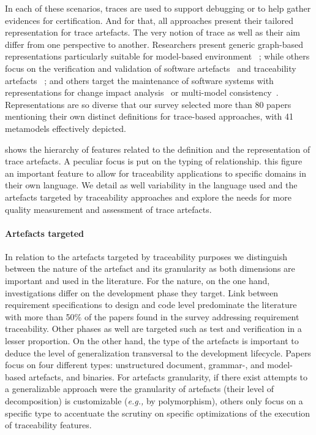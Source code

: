 In each of these scenarios, traces are used to support debugging or to help gather evidences for certification. And for that, all approaches present their tailored representation for trace artefacts. The very notion of trace as well as their aim differ from one perspective to another. %
Researchers present generic graph-based representations particularly suitable for model-based environment~\cite{schwarz2010-graph-based-traceability,grammel2012-model-matching-for-traceability-in-MDE} ; while others focus on  the verification and validation of software artefacts~\cite{Dubois_2010,vonknethen2002-change-oriented-req-traceability-evolution-of-embedded-systems} and traceability artefacts~\cite{rempl2014-conformance-of-traceability-to-guidelines} ; and others target the maintenance of software systems with representations for change impact analysis~\cite{goknil2014-change-impact-analysis-for-requirement-metamodel} or multi-model consistency~\cite{Szabo_2013}. Representations are so diverse that our survey selected more than 80 papers mentioning their own distinct definitions for trace-based approaches, with 41 metamodels effectively depicted. 


 shows the hierarchy of features related to the definition and the representation of trace artefacts. A peculiar focus is put on the typing of relationship. this figure an important feature to allow for traceability applications to specific domains in their own language. We detail as well variability in the language used and the artefacts targeted by traceability approaches and explore the needs for more quality measurement and assessment of trace artefacts.


\paragraph{Artefacts targeted} 
In relation to the artefacts targeted by traceability purposes we distinguish between the nature of the artefact and its granularity as both dimensions are important and used in the literature. For the nature, on the one hand, investigations differ on the development phase they target. Link between requirement specifications to design and code level predominate the literature with more than 50\% of the papers found in the survey addressing requirement traceability. Other phases as well are targeted such as test and verification in a lesser proportion. On the other hand, the type of the artefacts is important to deduce the level of generalization transversal to the development lifecycle. Papers focus on four different types: unstructured document, grammar-, and model-based artefacts, and binaries.
For artefacts granularity, if there exist attempts to a generalizable approach were the granularity of artefacts (their level of decomposition) is customizable (\textit{e.g.,} by polymorphism), others only focus on a specific type to accentuate the scrutiny on specific optimizations of the execution of traceability features.


